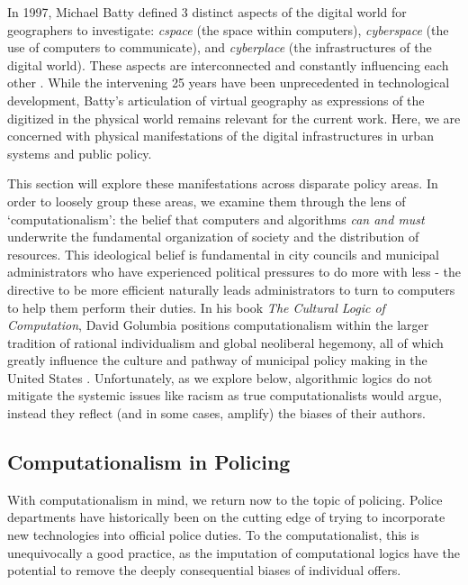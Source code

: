 In 1997, Michael Batty defined 3 distinct aspects of the digital world
for geographers to investigate: \emph{cspace} (the space within computers),
\emph{cyberspace} (the use of computers to communicate), and \emph{cyberplace} (the
infrastructures of the digital world). These aspects are
interconnected and constantly influencing each
other \citep{batty1997VirtualGeography}. While the intervening 25
years have been unprecedented in technological development, Batty's
articulation of virtual geography as expressions of the digitized in
the physical world remains relevant for the current work. Here, we are
concerned with physical manifestations of the digital infrastructures
in urban systems and public policy.

This section will explore these manifestations across disparate policy
areas. In order to loosely group these areas, we examine them through
the lens of `computationalism': the belief that computers and
algorithms \emph{can and must} underwrite the fundamental organization
of society and the distribution of resources. This ideological belief
is fundamental in city councils and municipal administrators who have
experienced political pressures to do more with less - the directive
to be more efficient naturally leads administrators to turn to
computers to help them perform their duties. In his book \emph{The
Cultural Logic of Computation}, David Golumbia positions
computationalism within the larger tradition of rational individualism
and global neoliberal hegemony, all of which greatly influence the
culture and pathway of municipal policy making in the United
States \citep{golumbia2009CulturalLogic}. Unfortunately, as we explore
below, algorithmic logics do not mitigate the systemic issues like
racism as true computationalists would argue, instead they reflect
(and in some cases, amplify) the biases of their authors.

\subsection{Computationalism in Policing}
With computationalism in mind, we return now to the topic of
policing. Police departments have historically been on the cutting
edge of trying to incorporate new technologies into official police
duties. To the computationalist, this is unequivocally a good
practice, as the imputation of computational logics have the potential
to remove the deeply consequential biases of individual offers.

